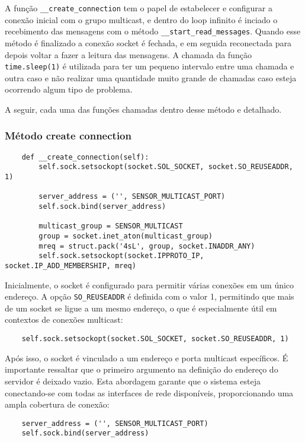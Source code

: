 A função \texttt{\_\_create\_connection} tem o papel de estabelecer e configurar a conexão inicial com o grupo multicast, e dentro do loop infinito é inciado o recebimento das mensagens com o método \texttt{\_\_start\_read\_messages}. Quando esse método é finalizado a conexão socket é fechada, e em seguida reconectada para depois voltar a fazer a leitura das mensagens. A chamada da função \texttt{time.sleep(1)} é utilizada para ter um pequeno intervalo entre uma chamada e outra caso e não realizar uma quantidade muito grande de chamadas caso esteja ocorrendo algum tipo de problema.

A seguir, cada uma das funções chamadas dentro desse método e detalhado.


\subsubsection[Método create connection]{Método create connection}

\begin{verbatim}
    def __create_connection(self):
        self.sock.setsockopt(socket.SOL_SOCKET, socket.SO_REUSEADDR, 1)

        server_address = ('', SENSOR_MULTICAST_PORT)
        self.sock.bind(server_address)

        multicast_group = SENSOR_MULTICAST
        group = socket.inet_aton(multicast_group)
        mreq = struct.pack('4sL', group, socket.INADDR_ANY)
        self.sock.setsockopt(socket.IPPROTO_IP, socket.IP_ADD_MEMBERSHIP, mreq)
\end{verbatim}

Inicialmente, o socket é configurado para permitir várias conexões em um único endereço. A opção \texttt{SO\_REUSEADDR} é definida com o valor 1, permitindo que mais de um socket se ligue a um mesmo endereço, o que é especialmente útil em contextos de conexões multicast:

\begin{verbatim}
    self.sock.setsockopt(socket.SOL_SOCKET, socket.SO_REUSEADDR, 1)
\end{verbatim}

Após isso, o socket é vinculado a um endereço e porta multicast específicos. É importante ressaltar que o primeiro argumento na definição do endereço do servidor é deixado vazio. Esta abordagem garante que o sistema esteja conectando-se com todas as interfaces de rede disponíveis, proporcionando uma ampla cobertura de conexão:

\begin{verbatim}
    server_address = ('', SENSOR_MULTICAST_PORT)
    self.sock.bind(server_address)
\end{verbatim}

